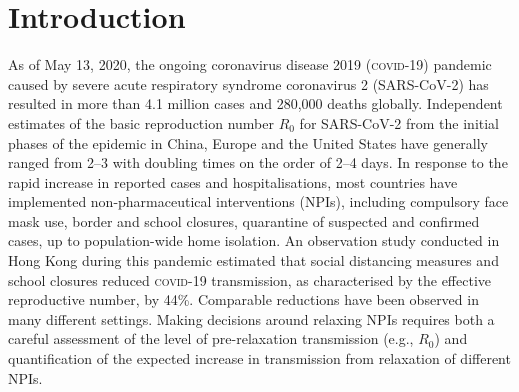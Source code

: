 \section{Introduction}
As of May 13, 2020, the ongoing coronavirus disease 2019 (\textsc{covid}-19) pandemic caused by severe acute respiratory syndrome coronavirus 2 (SARS-CoV-2) has resulted in more than 4.1 million cases and 280,000 deaths globally\cite{WHO:WHOSituationReport:2020}. Independent estimates of the basic reproduction number $R_0$ for SARS-CoV-2 from the initial phases of the epidemic in China, Europe and the United States have generally ranged from 2–3\cite{Riou:PatternEarlyHumantohuman:2020} with doubling times on the order of 2–4 days. In response to the rapid increase in reported cases and hospitalisations, most countries have implemented non-pharmaceutical interventions (NPIs), including compulsory face mask use, border and school closures, quarantine of suspected and confirmed cases, up to population-wide home isolation\cite{HITCOVIDTeam:HealthInterventionsTracking:2020}. An observation study conducted in Hong Kong during this pandemic estimated that social distancing measures and school closures reduced \textsc{covid}-19 transmission, as characterised by the effective reproductive number, by 44\%\cite{Cowling:ImpactAssessmentNonpharmaceutical:2020}. Comparable reductions have been observed in many different settings\cite{Flaxman:Report13Estimating:2020}. Making decisions around relaxing NPIs requires both a careful assessment of the level of pre-relaxation transmission (e.g., $R_0$) and quantification of the expected increase in transmission from relaxation of different NPIs. 

